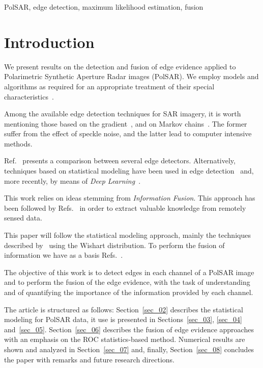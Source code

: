 \documentclass[conference]{IEEEtran}
\begin{document}
\begin{IEEEkeywords}
PolSAR, edge detection, maximum likelihood estimation, fusion
\end{IEEEkeywords}

\section{Introduction}\label{sec_01}

We present results on the detection and fusion of edge evidence applied to Polarimetric Synthetic Aperture Radar images (PolSAR). 
We employ models and algorithms as required for an appropriate treatment of their special characteristics~\cite{slf_2008}.

Among the available edge detection techniques for SAR imagery, it is worth mentioning those based on the gradient~\cite{tlb, obw, flmc, fyf}, and on Markov chains~\cite{bf}.
The former suffer from the effect of speckle noise, and the latter lead to computer intensive methods.

Ref.~\cite{gfn} presents a comparison between several edge detectors. 
Alternatively, techniques based on statistical modeling have been used in edge detection~\cite{gmbf, fbgm, horrit, gfn} and, more recently, by means of \textit{Deep Learning}~\cite{bac, ztmxzxf, tabmm, xstz}.

This work relies on ideas stemming from \textit{Information Fusion}.
This approach has been followed by Refs.~\cite{sglmla,sg} in order to extract valuable knowledge from remotely sensed data.

This paper will follow the statistical modeling approach, mainly the techniques described by~\cite{fbgm, nhfc} using the Wishart distribution. 
To perform the fusion of information we have as a basis Refs.~\cite{mit, sg}. 

The objective of this work is to detect edges in each channel of a PolSAR image and to perform the fusion of the edge evidence, with the task of understanding and of quantifying the importance of the information provided by each channel. 

The article is structured as follows: 
Section~\ref{sec_02} describes the statistical modeling for PolSAR data, 
it use is presented in Sections~\ref{sec_03}, \ref{sec_04} and~\ref{sec_05}.
Section~\ref{sec_06} describes the fusion of edge evidence approaches with an emphasis on the ROC statistics-based method.
Numerical results are shown and analyzed in Section~\ref{sec_07} and, finally, Section~\ref{sec_08} concludes the paper with remarks and future research directions.
\end{document}
